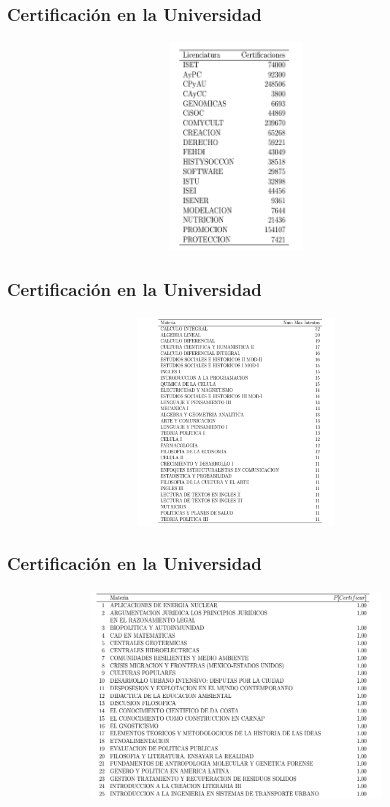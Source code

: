 \documentclass[xcolor=dvipsnames]{beamer}
\begin{document}
\begin{frame}\frametitle{Certificaci\'on en la Universidad}
\textbf{
}
\begin{figure}[H]
\centering
\includegraphics[width=10cm,height=5.5cm]{Tablas/CertificacionTtlLic.png}
\end{figure}
\end{frame}


\begin{frame}\frametitle{Certificaci\'on en la Universidad}
\textbf{
}
\begin{figure}[H]
\centering
\includegraphics[width=10cm,height=5.5cm]{Tablas/MateriaMaxIntNoCert.png}
\end{figure}
\end{frame}

\begin{frame}\frametitle{Certificaci\'on en la Universidad}
\textbf{
}
\begin{figure}[H]
\centering
\includegraphics[width=10cm,height=5.5cm]{Tablas/MateriasCertPrimera.png}
\end{figure}
\end{frame}
\end{document}
